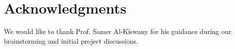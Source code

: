 \section{Acknowledgments}

We would like to thank Prof. Samer Al-Kiswany for his guidance during our brainstorming and initial project discussions.